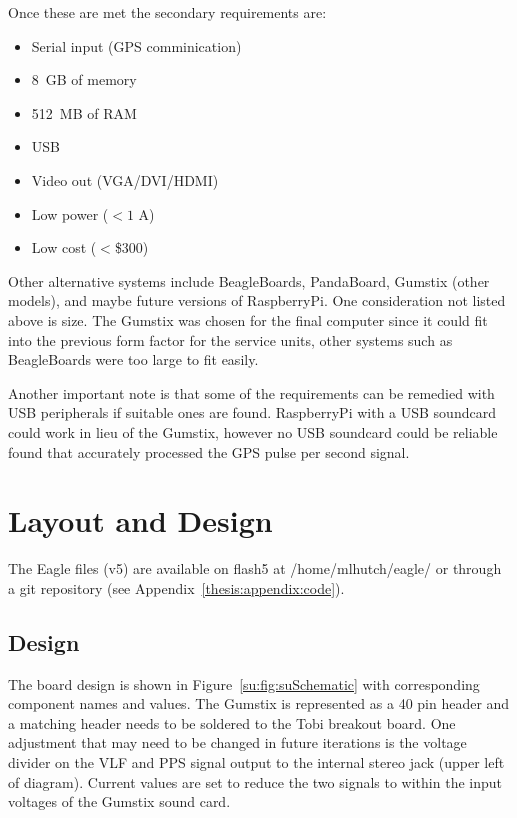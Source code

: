 Once these are met the secondary requirements are:

\begin{itemize}
\item{Serial input (GPS comminication)}
\item{8~GB of memory}
\item{512~MB of RAM}
\item{USB}
\item{Video out (VGA/DVI/HDMI)}
\item{Low power ($<1$ A)}
\item{Low cost ($<$\$300)}
\end{itemize}

Other alternative systems include BeagleBoards, PandaBoard, Gumstix (other models), and maybe future versions of RaspberryPi.
One consideration not listed above is size.
The Gumstix was chosen for the final computer since it could fit into the previous form factor for the service units, other systems such as BeagleBoards were too large to fit easily.

Another important note is that some of the requirements can be remedied with USB peripherals if suitable ones are found.
RaspberryPi with a USB soundcard could work in lieu of the Gumstix, however no USB soundcard could be reliable found that accurately processed the GPS pulse per second signal.

\section{Layout and Design}

The Eagle files (v5) are available on flash5 at /home/mlhutch/eagle/ or through a git repository (see Appendix~\ref{thesis:appendix:code}). 

\subsection{Design}

The board design is shown in Figure~\ref{su:fig:suSchematic} with corresponding component names and values.
The Gumstix is represented as a 40 pin header and a matching header needs to be soldered to the Tobi breakout board.
One adjustment that may need to be changed in future iterations is the voltage divider on the VLF and PPS signal output to the internal stereo jack (upper left of diagram).
Current values are set to reduce the two signals to within the input voltages of the Gumstix sound card.

